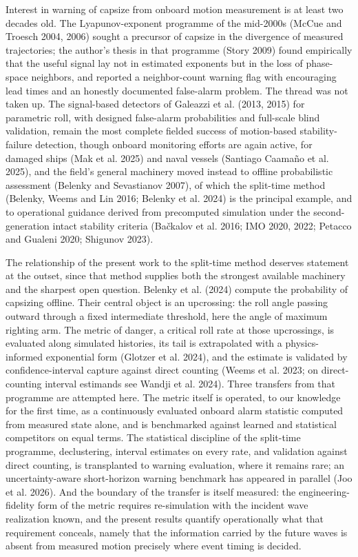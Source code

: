 \documentclass[11pt]{article}
\begin{document}
Interest in warning of capsize from onboard motion measurement is at least two decades old. The
Lyapunov-exponent programme of the mid-2000s (McCue and Troesch 2004, 2006) sought a precursor
of capsize in the divergence of measured trajectories; the author's
thesis in that programme (Story 2009) found empirically that the useful signal lay not in
estimated exponents but in the loss of phase-space neighbors, and reported a neighbor-count
warning flag with encouraging lead times and an honestly documented false-alarm problem. The
thread was not taken up. The signal-based detectors of Galeazzi et al. (2013, 2015) for
parametric roll, with designed false-alarm probabilities and full-scale blind validation, remain
the most complete fielded success of motion-based stability-failure detection, though onboard
monitoring efforts are again active, for damaged ships (Mak et al. 2025) and naval vessels
(Santiago Caama\~no et al. 2025), and the field's general
machinery moved instead to offline probabilistic assessment (Belenky and Sevastianov 2007), of
which the split-time method (Belenky, Weems and Lin 2016; Belenky et al. 2024) is the principal
example, and to operational guidance derived from precomputed simulation under the
second-generation intact stability criteria (Ba\v{c}kalov et al. 2016; IMO 2020, 2022; Petacco and
Gualeni 2020; Shigunov 2023).

The relationship of the present work to the split-time method deserves statement at the outset,
since that method supplies both the strongest available machinery and the sharpest open question.
Belenky et al. (2024) compute the probability of capsizing offline. Their central object is an
upcrossing: the roll angle passing outward through a fixed intermediate threshold, here the
angle of maximum righting arm. The metric of danger, a critical roll rate at those upcrossings,
is evaluated along simulated histories, its tail is
extrapolated with a physics-informed exponential form (Glotzer et al. 2024), and the estimate
is validated by confidence-interval capture against direct counting (Weems et al. 2023; on
direct-counting interval estimands see Wandji et al. 2024). Three transfers from that programme are
attempted here. The metric itself is operated, to our knowledge for the first time, as a
continuously evaluated onboard alarm statistic computed from measured state alone, and is
benchmarked against learned and statistical competitors on equal terms. The statistical
discipline of the split-time programme, declustering, interval estimates on every rate, and
validation against direct counting, is transplanted to warning evaluation, where it remains
rare; an uncertainty-aware short-horizon warning benchmark has appeared in parallel (Joo et
al. 2026). And the boundary of the transfer is itself measured: the engineering-fidelity form of the
metric requires re-simulation with the incident wave realization known, and the present results
quantify operationally what that requirement conceals, namely that the information carried by the
future waves is absent from measured motion precisely where event timing is decided.
\end{document}
